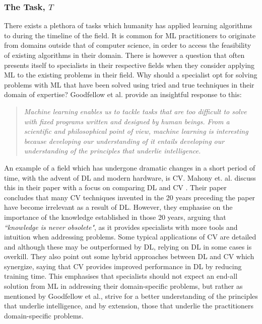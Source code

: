 \subsubsection{The Task, $T$}
There exists a plethora of tasks which humanity has applied learning algorithms
to during the timeline of the field. It is common for \gls{ML} practitioners to
originate from domains outside that of computer science, in order to access the
feasibility of existing algorithms in their domain. There is however a question
that often presents itself to specialists in their respective fields when they
consider applying \gls{ML} to the existing problems in their field. Why should a
specialist opt for solving problems with \gls{ML} that have been solved using
tried and true techniques in their domain of expertise? Goodfellow et al.
\cite{Goodfellow-et-al-2016} provide an insightful response to this:

\begin{quotation}
    \textit{
        Machine learning enables us to tackle tasks that are too difficult to
        solve with fixed programs written and designed by human beings. From a
        scientific and philosophical point of view, machine learning is
        interesting because developing our understanding of it entails
        developing our understanding of the principles that underlie
        intelligence.
    }
\end{quotation}
An example of a field which has undergone dramatic changes in a short period of
time, with the advent of \gls{DL} and modern hardware, is \gls{CV}. Mahony et.
al. discuss this in their paper with a focus on comparing \gls{DL} and \gls{CV}
\cite{Mahony-et-al-2020}. Their paper concludes that many \gls{CV} techniques
invented in the 20 years preceding the paper have become irrelevant as a result
of \gls{DL}. However, they emphasise on the importance of the knowledge
established in those 20 years, arguing that \textit{``knowledge is never
obsolete"}, as it provides specialists with more tools and intuition when
addressing problems. Some typical applications of \gls{CV} are detailed and
although these may be outperformed by \gls{DL}, relying on \gls{DL} in some
cases is overkill. They also point out some hybrid approaches between \gls{DL}
and \gls{CV} which synergize, saying that \gls{CV} provides improved performance
in \gls{DL} by reducing training time. This emphasises that specialists should
not expect an end-all solution from \gls{ML} in addressing their domain-specific
problems, but rather as mentioned by Goodfellow et al., strive for a better
understanding of the principles that underlie intelligence, and by extension,
those that underlie the practitioners domain-specific problems.

